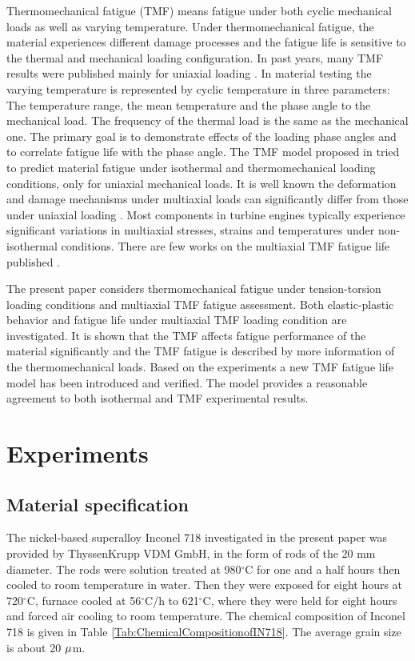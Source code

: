 \documentclass[preprint,5p,twocolumn,11pt,sort&compress]{elsarticle}
\begin{document}
Thermomechanical fatigue (TMF) means fatigue under both cyclic mechanical loads as well as varying temperature. Under thermomechanical fatigue, the material experiences different damage processes and the fatigue life is sensitive to the thermal and mechanical loading configuration. In past years, many TMF results were published mainly for uniaxial loading \cite{Evans2008, Kulawinski2015, Remy2003, Bauer2009}. In material testing the varying temperature is represented by cyclic temperature in three parameters: The temperature range, the mean temperature and the phase angle to the mechanical load. The frequency of the thermal load is the same as the mechanical one.  The primary goal is to demonstrate effects of the loading phase angles and to correlate fatigue life with the phase angle. The TMF model proposed in \cite{Vose2013} tried to predict  material fatigue under isothermal and thermomechanical loading conditions, only for uniaxial mechanical loads. It is well known the deformation and damage mechanisms under multiaxial loads can significantly differ from those under uniaxial loading \cite{Fang2015, Kang2004, Chen2004}. Most components in turbine engines typically experience significant variations in multiaxial stresses, strains and temperatures under non-isothermal conditions. There are few works on the multiaxial TMF fatigue life published \cite{Brookes2010}.

The present paper considers thermomechanical fatigue under tension-torsion loading conditions and multiaxial TMF fatigue assessment. Both elastic-plastic behavior and fatigue life under multiaxial TMF loading condition are investigated. It is shown that the TMF affects fatigue performance of the material significantly and the TMF fatigue is described by more information of the thermomechanical loads. Based on the experiments a new TMF fatigue life model has been introduced and verified. The model provides a reasonable agreement to both isothermal and TMF experimental results.

\section{Experiments}
\subsection{Material specification}
The nickel-based superalloy Inconel 718 investigated in the present paper was provided by ThyssenKrupp VDM GmbH, in the form of rods of the 20 mm diameter.
The rods were solution treated at 980$^{\circ}$C for one and a half hours then cooled to room temperature in water.
Then they were exposed for eight hours at 720$^{\circ}$C, furnace cooled at 56$^{\circ}$C/h to 621$^{\circ}$C, where they were held for eight hours and forced air cooling to room temperature.
The chemical composition of Inconel 718 is given in Table \ref{Tab:ChemicalCompositionofIN718}.
The average grain size is about 20 $\rm{\mu }$m.
\end{document}
